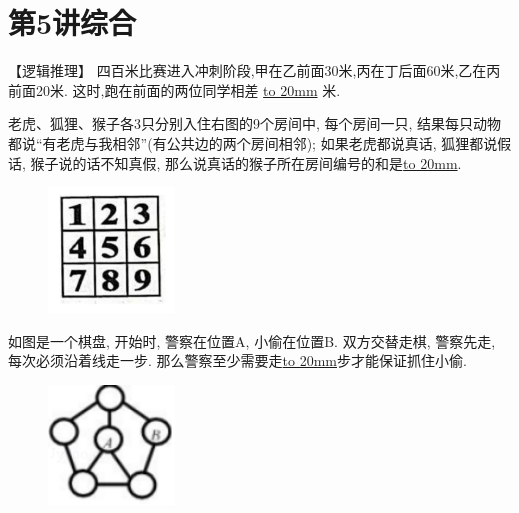 \section{第5讲\quad 综合}

\item {
    【逻辑推理】
    四百米比赛进入冲刺阶段,甲在乙前面30米,丙在丁后面60米,乙在丙前面20米. 这时,跑在前面的两位同学相差 \underline{\hbox to 20mm{}} 米.
    \vspace{1cm}
}

\item {
    老虎、狐狸、猴子各3只分别入住右图的9个房间中, 每个房间一只, 结果每只动物都说``有老虎与我相邻''(有公共边的两个房间相邻); 如果老虎都说真话, 狐狸都说假话, 猴子说的话不知真假, 那么说真话的猴子所在房间编号的和是\underline{\hbox to 20mm{}}.
    \begin{figure}[H] 
        \centering
        \includegraphics[width=0.3\textwidth]{./pics/Chapter_7/4.png}
    \end{figure}
    \vspace{1cm}
}

\item {
    如图是一个棋盘, 开始时, 警察在位置A, 小偷在位置B. 双方交替走棋, 警察先走, 每次必须沿着线走一步. 那么警察至少需要走\underline{\hbox to 20mm{}}步才能保证抓住小偷.
    \begin{figure}[H] 
        \centering
        \includegraphics[width=0.3\textwidth]{./pics/Chapter_7/2015_1.png}
    \end{figure}
    \vspace{1cm}
}

